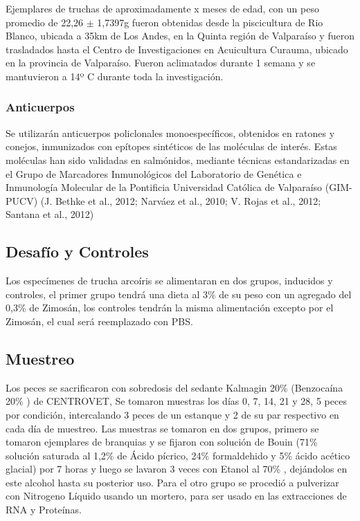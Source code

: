 \documentclass[12pt,a4paper,]{article}
\begin{document}
Ejemplares de truchas de aproximadamente x meses de edad, con un peso
promedio de 22,26 $\pm$ 1,7397g fueron obtenidas desde la piscicultura
de Rio Blanco, ubicada a 35km de Los Andes, en la Quinta región de
Valparaíso y fueron trasladados hasta el Centro de Investigaciones en
Acuicultura Curauma, ubicado en la provincia de Valparaíso. Fueron
aclimatados durante 1 semana y se mantuvieron a 14º C durante toda la
investigación.

\subsubsection{Anticuerpos}\label{anticuerpos}

Se utilizarán anticuerpos policlonales monoespecíficos, obtenidos en
ratones y conejos, inmunizados con epítopes sintéticos de las moléculas
de interés. Estas moléculas han sido validadas en salmónidos, mediante
técnicas estandarizadas en el Grupo de Marcadores Inmunológicos del
Laboratorio de Genética e Inmunología Molecular de la Pontificia
Universidad Católica de Valparaíso (GIM-PUCV) (J. Bethke et al., 2012;
Narváez et al., 2010; V. Rojas et al., 2012; Santana et al., 2012)

\subsection{Desafío y Controles}\label{desafuxedo-y-controles}

Los especímenes de trucha arcoíris se alimentaran en dos grupos,
inducidos y controles, el primer grupo tendrá una dieta al 3\% de su
peso con un agregado del 0,3\% de Zimosán, los controles tendrán la
misma alimentación excepto por el Zimosán, el cual será reemplazado con
PBS.

\subsection{Muestreo}\label{muestreo}

Los peces se sacrificaron con sobredosis del sedante Kalmagin 20\%
(Benzocaína 20\% ) de CENTROVET, Se tomaron muestras los días 0, 7, 14,
21 y 28, 5 peces por condición, intercalando 3 peces de un estanque y 2
de su par respectivo en cada día de muestreo. Las muestras se tomaron en
dos grupos, primero se tomaron ejemplares de branquias y se fijaron con
solución de Bouin (71\% solución saturada al 1,2\% de Ácido pícrico,
24\% formaldehido y 5\% ácido acético glacial) por 7 horas y luego se
lavaron 3 veces con Etanol al 70\% , dejándolos en este alcohol hasta su
posterior uso. Para el otro grupo se procedió a pulverizar con Nitrogeno
Líquido usando un mortero, para ser usado en las extracciones de RNA y
Proteínas.
\end{document}
